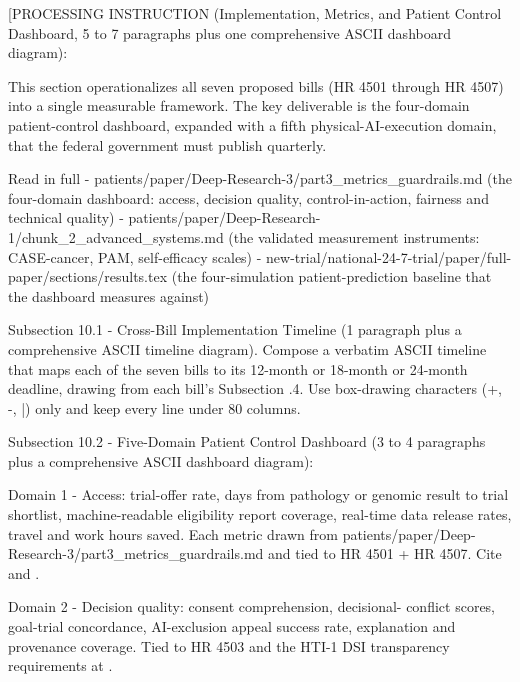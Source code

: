 
[PROCESSING INSTRUCTION (Implementation, Metrics, and Patient Control
Dashboard, 5 to 7 paragraphs plus one comprehensive ASCII dashboard
diagram):

This section operationalizes all seven proposed bills (HR 4501
through HR 4507) into a single measurable framework. The key
deliverable is the four-domain patient-control dashboard, expanded
with a fifth physical-AI-execution domain, that the federal
government must publish quarterly.

Read in full
- patients/paper/Deep-Research-3/part3\_metrics\_guardrails.md (the
  four-domain dashboard: access, decision quality, control-in-action,
  fairness and technical quality)
- patients/paper/Deep-Research-1/chunk\_2\_advanced\_systems.md (the
  validated measurement instruments: CASE-cancer, PAM, self-efficacy
  scales)
- new-trial/national-24-7-trial/paper/full-paper/sections/results.tex
  (the four-simulation patient-prediction baseline that the dashboard
  measures against)

Subsection 10.1 - Cross-Bill Implementation Timeline (1 paragraph
plus a comprehensive ASCII timeline diagram). Compose a verbatim
ASCII timeline that maps each of the seven bills to its 12-month or
18-month or 24-month deadline, drawing from each bill's Subsection .4.
Use box-drawing characters (+, -, |) only and keep every line under
80 columns.

Subsection 10.2 - Five-Domain Patient Control Dashboard (3 to 4
paragraphs plus a comprehensive ASCII dashboard diagram):

Domain 1 - Access: trial-offer rate, days from pathology or genomic
result to trial shortlist, machine-readable eligibility report
coverage, real-time data release rates, travel and work hours saved.
Each metric drawn from
patients/paper/Deep-Research-3/part3\_metrics\_guardrails.md and tied
to HR 4501 + HR 4507. Cite \cite{hhs_right_to_access_2025} and
\cite{rocque2025remote_symptom_monitoring}.

Domain 2 - Decision quality: consent comprehension, decisional-
conflict scores, goal-trial concordance, AI-exclusion appeal success
rate, explanation and provenance coverage. Tied to HR 4503 and the
HTI-1 DSI transparency requirements at \cite{hti1_dsi_fact_sheet_2023}.

